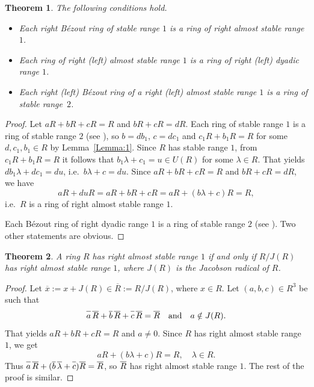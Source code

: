 \documentclass[12pt,a4paper, reqno]{amsart}
\newtheorem{theorem}{Theorem}
\begin{document}
\begin{theorem}\label{T:1}
The following conditions hold.
\begin{itemize}
\item[(i)] Each right B\'ezout ring of stable range $1$ is a ring of right almost stable range $1$.
\item[(ii)] Each ring of right (left) almost  stable range $1$ is a ring of right (left)  dyadic  range $1$.
\item[(iii)] Each right (left) B\'ezout ring of a right (left) almost stable range $1$ is a ring of stable  range~$2$.
\end{itemize}
\end{theorem}

\begin{proof}
Let $aR+bR+cR=R$ and $bR+cR=dR$. Each ring of stable range $1$ is a ring of stable range $2$ (see \cite[p.\,14]{1-bass}), so  $b=db_1$, $c=dc_1$ and $c_1R+b_1R=R$ for some $d,c_1,b_1\in R$ by Lemma~\ref{Lemma:1}. Since $R$ has  stable range $1$, from $c_1R+b_1R=R$ it follows that  $b_1\lambda+c_1=u\in U(R)$ for some $\lambda\in R$. That yields $db_1\lambda+dc_1=du$, i.e.~$b\lambda+c=du$. Since $aR+bR+cR=R$ and $bR+cR=dR$, we have
\[
aR+duR=aR+bR+cR=aR+(b\lambda+c)R=R,
\]
i.e.~$R$ is a ring of right almost stable range $1$.

Each B\'ezout ring of right dyadic range $1$ is a ring of stable range $2$ (see  \cite[Theorem~2.1]{3-zabavsky}). Two other statements are obvious.
\end{proof}



\begin{theorem}\label{T:2}
A ring $R$ has  right almost stable range $1$ if and only
if\/ $R/J(R)$ has right almost stable range $1$, where $J(R)$ is the Jacobson radical of\/ $R$.
\end{theorem}
\begin{proof} Let $\overline{x}:=x+J(R)\in \overline{R}:=R/J(R)$, where $x\in R$. Let $(a,b,c)\in R^3$ be such that
\[
\overline{a\vphantom{b}}\,\overline{R\vphantom{b}}+\overline{b}\,\overline{R\vphantom{b}}
+\overline{c\vphantom{b}}\,\overline{R\vphantom{b}}=\overline{R\vphantom{b}}
\quad\text{and}\quad a\notin J(R).
\]
That  yields   $aR+bR+cR=R$ and $a\ne0$. Since $R$ has  right almost stable range $1$, we get
\[
aR+(b\lambda +c)R=R, \quad \lambda\in R.
\]
Thus  $\overline{a\vphantom{b}}\,\overline{R\vphantom{b}}+(\overline{b}\,\overline{\lambda}
+\overline{c\vphantom{b}})\overline{R\vphantom{b}}=\overline{R\vphantom{b}}$,
so   $\overline{R\vphantom{b}}$ has  right almost stable range $1$. The rest of the proof is similar.
\end{proof}
\end{document}
